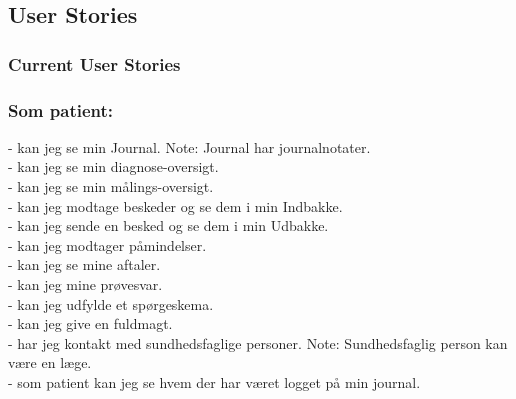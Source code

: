 %
%
%
%
%
%
\subsection{User Stories}
\subsubsection{\textbf{Current User Stories}} %
\subsubsection*{Som patient:}
- kan jeg se min Journal. Note: Journal har journalnotater. \\
- kan jeg se min diagnose-oversigt.\\
- kan jeg se min målings-oversigt.\\
- kan jeg modtage beskeder og se dem i min Indbakke.\\
- kan jeg sende en besked og se dem i min Udbakke.\\
- kan jeg modtager påmindelser.\\
- kan jeg se mine aftaler. \\
- kan jeg mine prøvesvar.\\
- kan jeg udfylde et spørgeskema.\\
- kan jeg give en fuldmagt. \\
- har jeg kontakt med sundhedsfaglige personer. Note: Sundhedsfaglig person kan være en læge. \\
- som patient kan jeg se hvem der har været logget på min journal.
